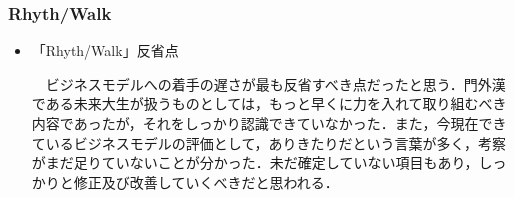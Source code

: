 \subsubsection{Rhyth/Walk}
\begin{itemize}
\par
　「Cool Japanimation」と同様の期間で，同じく未来大のみで書類を作成した．場所を問わず何度も会議を重ね，もらったレビューに対してどうすべきかを班の皆で話し合い，完成へと扱ぎ付けた．収支予測など分からないことは昨年の例やネット文献，先輩の助言などを頼りに調べ，分からないなりにうまく仕上げることができた．しかし，こちらも「Cool Japanimation」同様一次審査を通過することは叶わなかった．
\item「Rhyth/Walk」反省点
\par
　ビジネスモデルへの着手の遅さが最も反省すべき点だったと思う．門外漢である未来大生が扱うものとしては，もっと早くに力を入れて取り組むべき内容であったが，それをしっかり認識できていなかった．また，今現在できているビジネスモデルの評価として，ありきたりだという言葉が多く，考察がまだ足りていないことが分かった．未だ確定していない項目もあり，しっかりと修正及び改善していくべきだと思われる．
\end{itemize}
